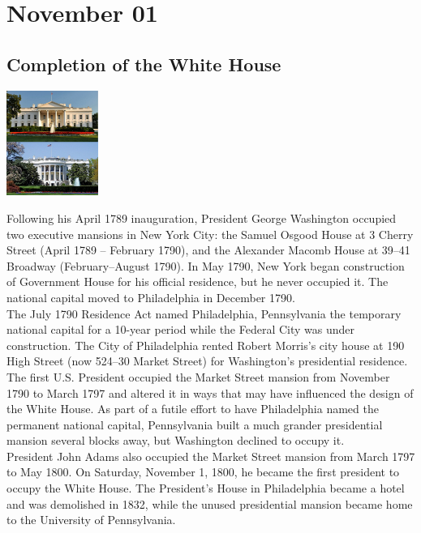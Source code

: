 \documentclass[11pt]{report}
\begin{document}
\section{November 01}
\subsection{Completion of the White House}
\vspace{2mm}\begin{center}\includegraphics[width=3cm]{./img/whiteHouse.jpg}\end{center}
Following his April 1789 inauguration, President George Washington occupied two executive mansions in New York City: the Samuel Osgood House at 3 Cherry Street (April 1789 – February 1790), and the Alexander Macomb House at 39–41 Broadway (February–August 1790). In May 1790, New York began construction of Government House for his official residence, but he never occupied it. The national capital moved to Philadelphia in December 1790.\\
\indent The July 1790 Residence Act named Philadelphia, Pennsylvania the temporary national capital for a 10-year period while the Federal City was under construction. The City of Philadelphia rented Robert Morris's city house at 190 High Street (now 524–30 Market Street) for Washington's presidential residence.\\
\indent The first U.S. President occupied the Market Street mansion from November 1790 to March 1797 and altered it in ways that may have influenced the design of the White House. As part of a futile effort to have Philadelphia named the permanent national capital, Pennsylvania built a much grander presidential mansion several blocks away, but Washington declined to occupy it.\\
\indent President John Adams also occupied the Market Street mansion from March 1797 to May 1800. On Saturday, November 1, 1800, he became the first president to occupy the White House. The President's House in Philadelphia became a hotel and was demolished in 1832, while the unused presidential mansion became home to the University of Pennsylvania.
\end{document}
